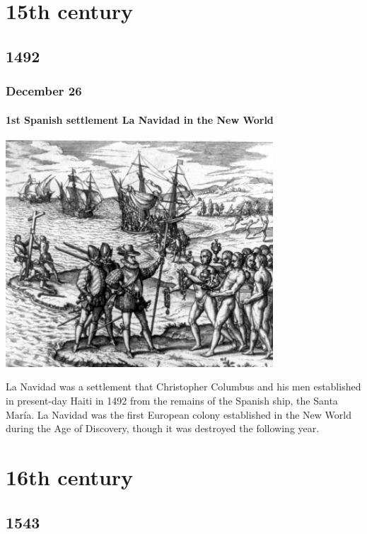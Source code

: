 \documentclass[11pt]{report}
\begin{document}
										
	
\part{15th century}
\chapter{1492}
\section{December 26}
\subsection{1st Spanish settlement La Navidad in the New World}
\vspace{2mm}\begin{center}\includegraphics[width=10cm]{./img/lanavidad.jpg}\end{center}
La Navidad was a settlement that Christopher Columbus and his men established in present-day Haiti in 1492 from the remains of the Spanish ship, the Santa María. La Navidad was the first European colony established in the New World during the Age of Discovery, though it was destroyed the following year.


										
										
\part{16th century}
\chapter{1543}
\end{document}
